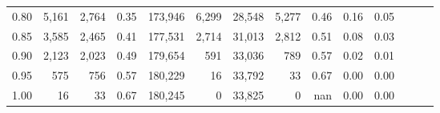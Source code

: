 \begin{tabular}{rrrrrrrrrrrrrr}
0.80 &   5,161 &  2,764 &  0.35 &  173,946 &    6,299 &  28,548 &   5,277 &  0.46 &  0.16 &      0.05 \\
0.85 &   3,585 &  2,465 &  0.41 &  177,531 &    2,714 &  31,013 &   2,812 &  0.51 &  0.08 &      0.03 \\
0.90 &   2,123 &  2,023 &  0.49 &  179,654 &      591 &  33,036 &     789 &  0.57 &  0.02 &      0.01 \\
0.95 &     575 &    756 &  0.57 &  180,229 &       16 &  33,792 &      33 &  0.67 &  0.00 &      0.00 \\
1.00 &      16 &     33 &  0.67 &  180,245 &        0 &  33,825 &       0 &   nan &  0.00 &      0.00 \\
\bottomrule
\end{tabular}
